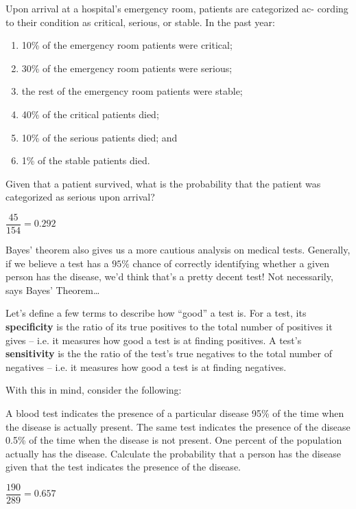 \documentclass[../main.tex]{subfiles}
\begin{document}
\begin{example}[Hospital, 10.4]
	\noindent
	Upon arrival at a hospital’s emergency room, patients are categorized ac-
	cording to their condition as critical, serious, or stable. In the past year:
	\begin{enumerate}[label=(\alph*)]
	\setlength{\itemsep}{-0.5em}
	\item 10\% of the emergency room patients were critical;
	 \item 30\% of the emergency room patients were serious;
	\item the rest of the emergency room patients were stable;
	\item 40\% of the critical patients died;
	\item 10\% of the serious patients died; and
	\item 1\% of the stable patients died.
	\end{enumerate}
	Given that a patient survived, what is the probability that the patient was
	categorized as serious upon arrival?
\end{example}
\begin{solution}[Answer.]
$\dfrac{45}{154} = 0.292$
\end{solution}

Bayes' theorem also gives us a more cautious analysis on medical tests. Generally, if we believe a test has a $95\%$ chance of correctly identifying whether a given person has the disease, we'd think that's a pretty decent test! Not necessarily, says Bayes' Theorem\ldots

Let's define a few terms to describe how ``good'' a test is. For a test, its \textbf{specificity} is the ratio of its true positives to the total number of positives it gives -- i.e. it measures how good a test is at finding positives. A test's \textbf{sensitivity} is the the ratio of the test's true negatives to the total number of negatives -- i.e. it measures how good a test is at finding negatives.

With this in mind, consider the following: 
\begin{example}[Disease, 10.7]
A blood test indicates the presence of a particular disease 95\% of the time
when the disease is actually present. The same test indicates the presence of
the disease 0.5\% of the time when the disease is not present. One percent of
the population actually has the disease.
Calculate the probability that a person has the disease given that the test
indicates the presence of the disease.
\end{example}
\begin{solution}[Answer.]
$\dfrac{190}{289} = 0.657$
\end{solution}
\end{document}
